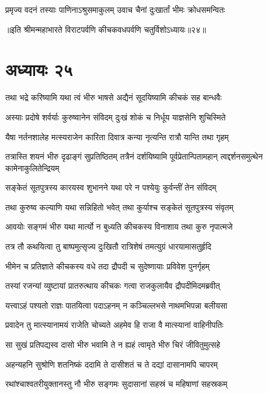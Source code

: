 \twolineshloka
{प्रमृज्य वदनं तस्याः पाणिनाऽश्रुसमाकुलम्}
{उवाच चैनां दुःखार्तां भीमः क्रोधसमन्वितः}

॥इति श्रीमन्महाभारते विराटपर्वणि कीचकवधपर्वणि चतुर्विशोऽध्यायः॥२४॥

\chapter{अध्यायः २५}

\twolineshloka
{तथा भद्रे करिष्यामि यथा त्वं भीरु भाषसे}
{अद्यैनं सूदयिष्यामि कीचकं सह बान्धवैः}


\twolineshloka
{अस्याः प्रदोषे शर्वर्याः कुरुष्वानेन संविदम्}
{दुःखं शोकं च निर्धूय याज्ञसेनि शुचिस्मिते}


\twolineshloka
{यैषा नर्तनशालेह मत्स्यराजेन कारिता}
{दिवात्र कन्या नृत्यन्ति रात्रौ यान्ति तथा गृहम्}


\threelineshloka
{तत्रास्ति शयनं भीरु दृढाङ्गं सुप्रतिष्ठितम्}
{तत्रैनं दर्शयिष्यामि पूर्वप्रेतान्पितामहान्}
{त्वद्दर्शनसमुत्थेन कामेनाकुलितेन्द्रियम्}


\twolineshloka
{सङ्केतं सूतपुत्रस्य कारयस्व शुभानने}
{यथा परे न पश्येयुः कुर्वन्तीं तेन संविदम्}


\twolineshloka
{तथा कुरुष्व कल्याणि यथा सन्निहितो भवेत्}
{तथा कुर्याश्च सङ्केतं सूतपुत्रस्य संवृतम्}


\twolineshloka
{आवयोः सङ्गमं भीरु यथा मार्त्यो न बुध्यति}
{कीचकस्य विनाशाय तथा कुरु नृपात्मजे}



\twolineshloka
{तत्र तौ कथयित्वा तु बाष्पमुत्सृज्य दुःखितौ}
{रात्रिशेषं तमत्युग्रं धारयामासतुर्हृदि}


\twolineshloka
{भीमेन च प्रतिज्ञाते कीचकस्य वधे तदा}
{द्रौपदी च सुदेष्णायाः प्रविवेश पुनर्गृहम्}


\twolineshloka
{तस्यां रजन्यां व्युष्टायां प्रातरुत्थाय कीचकः}
{गत्वा राजकुलायैव द्रौपदीमिदमब्रवीत्}


\twolineshloka
{यत्त्वाऽहं पश्यतो राज्ञः पातयित्वा पदाऽहनम्}
{न कञ्चिल्लभसे नाथमभिपन्ना बलीयसा}


\twolineshloka
{प्रवादेन तु मात्स्यानामयं राजेति चोच्यते}
{अहमेव हि राजा वै मात्स्यानां वाहिनीपतिः}


\twolineshloka
{सा सुखं प्रतिपद्यस्व दासो भीरु भवामि ते}
{न ह्यहं त्वामृते भीरु चिरं जीवितुमुत्सहे}


\twolineshloka
{अहन्यहनि सुश्रोणि शतनिष्कं ददामि ते}
{दासीशतं च ते दद्यां दासानामपि चापरम्}


\twolineshloka
{रथांश्चाश्वतरीयुक्तानस्तु नौ भीरु सङ्गमः}
{सुदासानां सहस्रं च महिषाणां सहस्रकम्}


